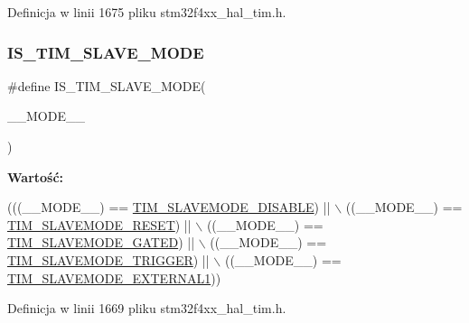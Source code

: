 Definicja w linii 1675 pliku stm32f4xx\+\_\+hal\+\_\+tim.\+h.

\mbox{\label{group___t_i_m___private___macros_gafce89506518ce113eb70e424f4dc1c5b}} 
\subsubsection{\texorpdfstring{I\+S\+\_\+\+T\+I\+M\+\_\+\+S\+L\+A\+V\+E\+\_\+\+M\+O\+DE}{IS\_TIM\_SLAVE\_MODE}}
{\footnotesize\ttfamily \#define I\+S\+\_\+\+T\+I\+M\+\_\+\+S\+L\+A\+V\+E\+\_\+\+M\+O\+DE(\begin{DoxyParamCaption}\item[{}]{\+\_\+\+\_\+\+M\+O\+D\+E\+\_\+\+\_\+ }\end{DoxyParamCaption})}

{\bfseries Wartość\+:}
\begin{DoxyCode}
(((\_\_MODE\_\_) == \hyperlink{group___t_i_m___slave___mode_ga3b53e1a85d08f125df4371f86bdaf79b}{TIM\_SLAVEMODE\_DISABLE})   || \(\backslash\)
                                     ((\_\_MODE\_\_) == \hyperlink{group___t_i_m___slave___mode_ga9f28e350c0560dc550f5c0d2f8b39ba7}{TIM\_SLAVEMODE\_RESET})     || \(\backslash\)
                                     ((\_\_MODE\_\_) == \hyperlink{group___t_i_m___slave___mode_ga4501317fcd7649e5ff46db6fe69938e0}{TIM\_SLAVEMODE\_GATED})     || \(\backslash\)
                                     ((\_\_MODE\_\_) == \hyperlink{group___t_i_m___slave___mode_ga12f8f7b4a16b438f54cf811f0bb0a8a4}{TIM\_SLAVEMODE\_TRIGGER})   || \(\backslash\)
                                     ((\_\_MODE\_\_) == \hyperlink{group___t_i_m___slave___mode_ga90dcf32a66dcb250b18da2ff56471328}{TIM\_SLAVEMODE\_EXTERNAL1}))
\end{DoxyCode}


Definicja w linii 1669 pliku stm32f4xx\+\_\+hal\+\_\+tim.\+h.

\mbox{\label{group___t_i_m___private___macros_ga44d4f84407e34dbd1ac3ccba12684975}} 
